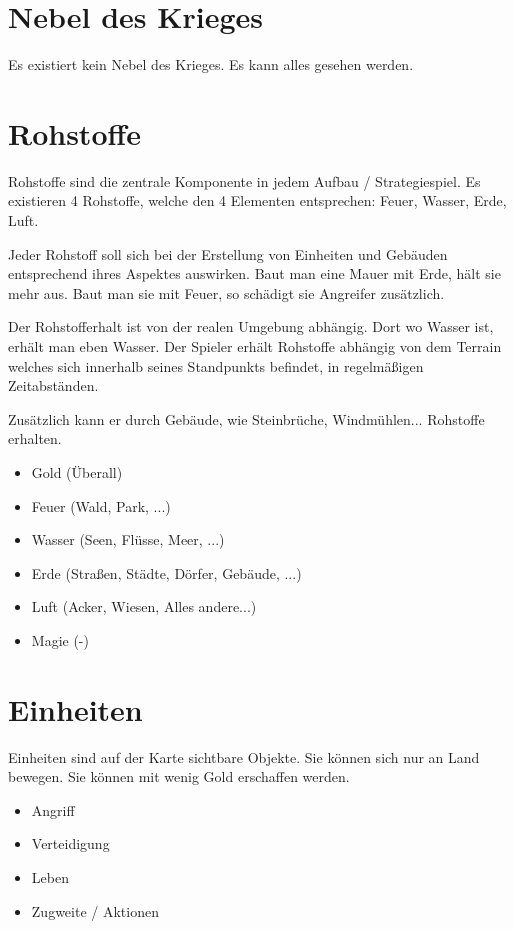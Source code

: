\section{Nebel des Krieges}
Es existiert kein Nebel des Krieges. Es kann alles gesehen werden.

\section{Rohstoffe}

Rohstoffe sind die zentrale Komponente in jedem Aufbau / Strategiespiel. Es existieren 4 Rohstoffe, welche den 4 Elementen entsprechen: Feuer, Wasser, Erde, Luft.

Jeder Rohstoff soll sich bei der Erstellung von Einheiten und Gebäuden entsprechend ihres Aspektes auswirken. Baut man eine Mauer mit Erde, hält sie mehr aus. Baut man sie mit Feuer, so schädigt sie Angreifer zusätzlich.

Der Rohstofferhalt ist von der realen Umgebung abhängig. Dort wo Wasser ist, erhält man eben Wasser. Der Spieler erhält Rohstoffe abhängig von dem Terrain welches sich innerhalb seines Standpunkts befindet, in regelmäßigen Zeitabständen.

Zusätzlich kann er durch Gebäude, wie Steinbrüche, Windmühlen... Rohstoffe erhalten.

\begin{itemize}
\item Gold (Überall)
\item Feuer (Wald, Park, ...)
\item Wasser (Seen, Flüsse, Meer, ...)
\item Erde (Straßen, Städte, Dörfer, Gebäude, ...)
\item Luft (Acker, Wiesen, Alles andere...)
\item Magie (-)
\end{itemize}

\section{Einheiten}

Einheiten sind auf der Karte sichtbare Objekte. Sie können sich nur an Land bewegen. Sie können mit wenig Gold erschaffen werden.
\begin{itemize}
\item Angriff 
\item Verteidigung
\item Leben
\item Zugweite / Aktionen
\end{itemize}


